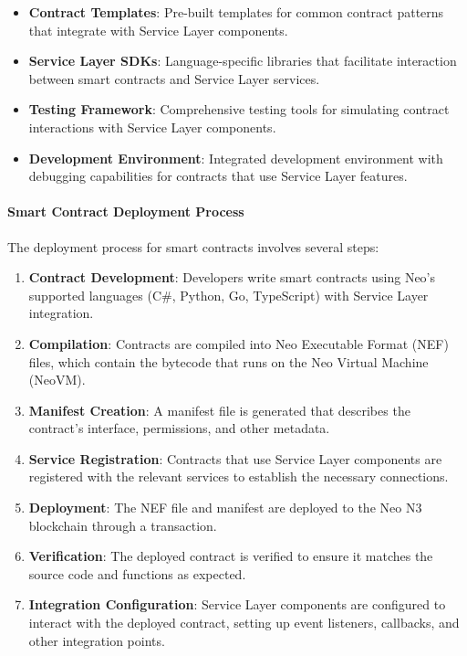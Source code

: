 \documentclass{article}
\begin{document}
\begin{itemize}
    \item \textbf{Contract Templates}: Pre-built templates for common contract patterns that integrate with Service Layer components.
    
    \item \textbf{Service Layer SDKs}: Language-specific libraries that facilitate interaction between smart contracts and Service Layer services.
    
    \item \textbf{Testing Framework}: Comprehensive testing tools for simulating contract interactions with Service Layer components.
    
    \item \textbf{Development Environment}: Integrated development environment with debugging capabilities for contracts that use Service Layer features.
\end{itemize}

\paragraph{Smart Contract Deployment Process}
The deployment process for smart contracts involves several steps:

\begin{enumerate}
    \item \textbf{Contract Development}: Developers write smart contracts using Neo's supported languages (C\#, Python, Go, TypeScript) with Service Layer integration.
    
    \item \textbf{Compilation}: Contracts are compiled into Neo Executable Format (NEF) files, which contain the bytecode that runs on the Neo Virtual Machine (NeoVM).
    
    \item \textbf{Manifest Creation}: A manifest file is generated that describes the contract's interface, permissions, and other metadata.
    
    \item \textbf{Service Registration}: Contracts that use Service Layer components are registered with the relevant services to establish the necessary connections.
    
    \item \textbf{Deployment}: The NEF file and manifest are deployed to the Neo N3 blockchain through a transaction.
    
    \item \textbf{Verification}: The deployed contract is verified to ensure it matches the source code and functions as expected.
    
    \item \textbf{Integration Configuration}: Service Layer components are configured to interact with the deployed contract, setting up event listeners, callbacks, and other integration points.
\end{enumerate}
\end{document}
